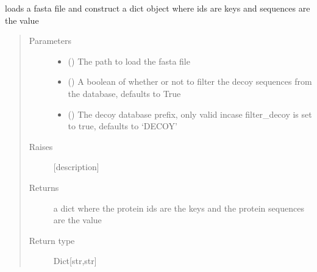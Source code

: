 \documentclass[letterpaper,10pt,english]{sphinxmanual}
\begin{document}
\begin{fulllineitems}
\label{\detokenize{IPTK.IO:IPTK.IO.InFunctions.fasta2dict}}
loads a fasta file and construct a dict object where ids are keys and sequences are the value
\begin{quote}\begin{description}
\item[{Parameters}] \leavevmode\begin{itemize}
\item {} 
 () \textendash{} The path to load the fasta file

\item {} 
 (\sphinxstyleliteralemphasis{\sphinxupquote{, }}) \textendash{} A boolean of whether or not to filter the decoy sequences from the database, defaults to True

\item {} 
 (\sphinxstyleliteralemphasis{\sphinxupquote{, }}) \textendash{} The decoy database prefix, only valid incase filter\_decoy is set to true, defaults to ‘DECOY’

\end{itemize}

\item[{Raises}] \leavevmode
{} \textendash{} {[}description{]}

\item[{Returns}] \leavevmode
a dict where the protein ids are the keys and the protein sequences are the value

\item[{Return type}] \leavevmode
Dict{[}str,str{]}

\end{description}\end{quote}

\end{fulllineitems}
\end{document}
